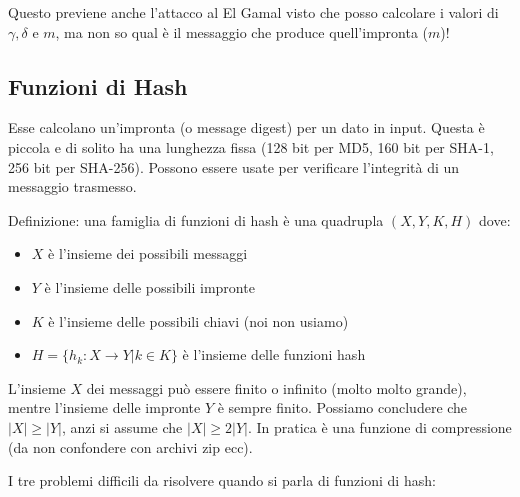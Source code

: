 Questo previene anche l'attacco al El Gamal visto che posso calcolare i valori di $\gamma, \delta$ e $m$, ma non so qual è il messaggio che produce quell'impronta ($m$)!

\subsection*{Funzioni di Hash}
Esse calcolano un'impronta (o message digest) per un dato in input.
Questa è piccola e di solito ha una lunghezza fissa (128 bit per MD5, 160 bit per SHA-1, 256 bit per SHA-256).
Possono essere usate per verificare l'integrità di un messaggio trasmesso.

Definizione: una famiglia di funzioni di hash è una quadrupla $(X,Y,K,H)$ dove:
\begin{itemize}
	\item $X$ è l'insieme dei possibili messaggi
	\item $Y$ è l'insieme delle possibili impronte
	\item $K$ è l'insieme delle possibili chiavi (noi non usiamo)
	\item $H=\{h_k:X \rightarrow Y | k \in K\}$ è l'insieme delle funzioni hash
\end{itemize}

L'insieme $X$ dei messaggi può essere finito o infinito (molto molto grande), mentre l'insieme delle impronte $Y$ è sempre finito.
Possiamo concludere che $|X| \geq |Y|$, anzi si assume che $|X| \geq 2|Y|$. In pratica è una funzione di compressione (da non confondere con archivi zip ecc).

I tre problemi difficili da risolvere quando si parla di funzioni di hash:

